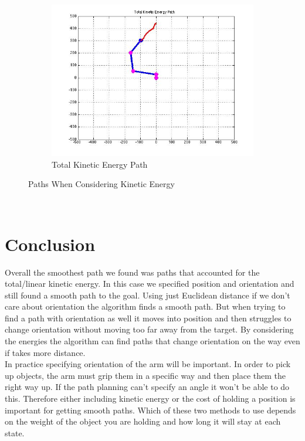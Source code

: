 \documentclass{article}
\begin{document}
\begin{figure}[htb]
\begin{subfigure}[b]{0.33\textwidth}
\includegraphics[scale=.33]{PathPics/Energy_Kinetic_Path.jpg}
\caption{Total Kinetic Energy Path}
\end{subfigure}

\caption{Paths When Considering Kinetic Energy}
\label{fig:EnergyPaths2}
\end{figure}\\
\section{Conclusion}
Overall the smoothest path we found was paths that accounted for the total/linear kinetic energy. In this case we specified position and orientation and still found a smooth path to the goal. Using just Euclidean distance if we don't care about orientation the algorithm finds a smooth path. But when trying to find a path with orientation as well it moves into position and then struggles to change orientation without moving too far away from the target. By considering the energies the algorithm can find paths that change orientation on the way even if takes more distance. \\
In practice specifying orientation of the arm will be important. In order to pick up objects, the arm must grip them in a specific way and then place them the right way up. If the path planning can't specify an angle it won't be able to do this. Therefore either including kinetic energy or the cost of holding a position is important for getting smooth paths. Which of these two methods to use depends on the weight of the object you are holding and how long it will stay at each state.
\end{document}
